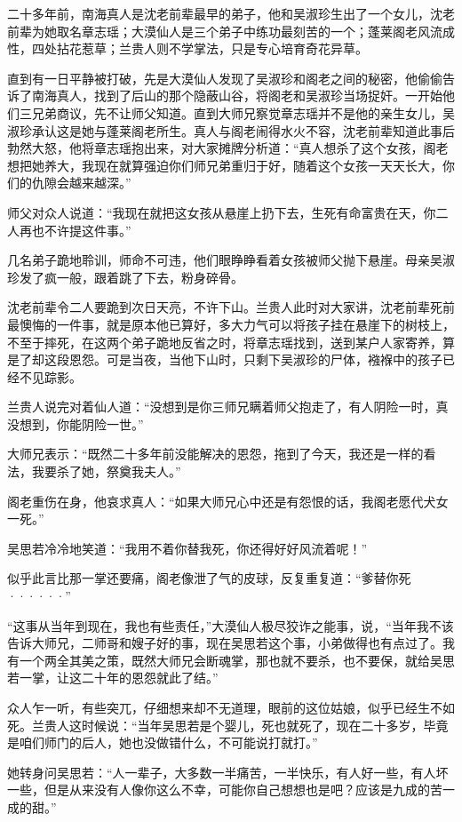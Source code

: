 二十多年前，南海真人是沈老前辈最早的弟子，他和吴淑珍生出了一个女儿，沈老前辈为她取名章志瑶；大漠仙人是三个弟子中练功最刻苦的一个；蓬莱阁老风流成性，四处拈花惹草；兰贵人则不学掌法，只是专心培育奇花异草。

直到有一日平静被打破，先是大漠仙人发现了吴淑珍和阁老之间的秘密，他偷偷告诉了南海真人，找到了后山的那个隐蔽山谷，将阁老和吴淑珍当场捉奸。一开始他们三兄弟商议，先不让师父知道。直到大师兄察觉章志瑶并不是他的亲生女儿，吴淑珍承认这是她与蓬莱阁老所生。真人与阁老闹得水火不容，沈老前辈知道此事后勃然大怒，他将章志瑶抱出来，对大家摊牌分析道：“真人想杀了这个女孩，阁老想把她养大，我现在就算强迫你们师兄弟重归于好，随着这个女孩一天天长大，你们的仇隙会越来越深。”

师父对众人说道：“我现在就把这女孩从悬崖上扔下去，生死有命富贵在天，你二人再也不许提这件事。”

几名弟子跪地聆训，师命不可违，他们眼睁睁看着女孩被师父抛下悬崖。母亲吴淑珍发了疯一般，跟着跳了下去，粉身碎骨。

沈老前辈令二人要跪到次日天亮，不许下山。兰贵人此时对大家讲，沈老前辈死前最懊悔的一件事，就是原本他已算好，多大力气可以将孩子挂在悬崖下的树枝上，不至于摔死，在这两个弟子跪地反省之时，将章志瑶找到，送到某户人家寄养，算是了却这段恩怨。可是当夜，当他下山时，只剩下吴淑珍的尸体，襁褓中的孩子已经不见踪影。

兰贵人说完对着仙人道：“没想到是你三师兄瞒着师父抱走了，有人阴险一时，真没想到，你能阴险一世。”

大师兄表示：“既然二十多年前没能解决的恩怨，拖到了今天，我还是一样的看法，我要杀了她，祭奠我夫人。”

阁老重伤在身，他哀求真人：“如果大师兄心中还是有怨恨的话，我阁老愿代犬女一死。”

吴思若冷冷地笑道：“我用不着你替我死，你还得好好风流着呢！”

似乎此言比那一掌还要痛，阁老像泄了气的皮球，反复重复道：“爹替你死······”

“这事从当年到现在，我也有些责任，”大漠仙人极尽狡诈之能事，说，“当年我不该告诉大师兄，二师哥和嫂子好的事，现在吴思若这个事，小弟做得也有点过了。我有一个两全其美之策，既然大师兄会断魂掌，那也就不要杀，也不要保，就给吴思若一掌，让这二十年的恩怨就此了结。”

众人乍一听，有些突兀，仔细想来却不无道理，眼前的这位姑娘，似乎已经生不如死。兰贵人这时候说：“当年吴思若是个婴儿，死也就死了，现在二十多岁，毕竟是咱们师门的后人，她也没做错什么，不可能说打就打。”

她转身问吴思若：“人一辈子，大多数一半痛苦，一半快乐，有人好一些，有人坏一些，但是从来没有人像你这么不幸，可能你自己想想也是吧？应该是九成的苦一成的甜。”

